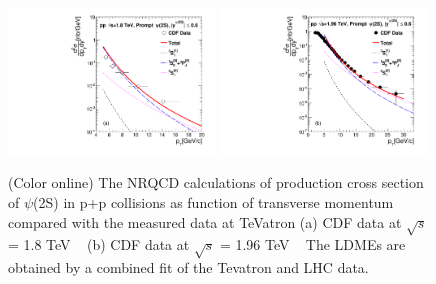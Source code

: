 \documentclass[aps,prc,preprint,superscriptaddress,showpacs,showkeys,amsmath]{revtex4-1}
\begin{document}
\begin{figure}
\includegraphics[width=0.49\textwidth]{Figures/Psi2S/Psi2S_CDF_180TeV.pdf}
\includegraphics[width=0.49\textwidth]{Figures/Psi2S/Psi2S_CDF_196TeV.pdf}
\caption{(Color online) The NRQCD calculations of production cross section 
of $\psi$(2S) in p+p collisions as function of transverse momentum compared 
with the measured data at TeVatron 
(a) CDF data at $\sqrt{s}$ = 1.8 TeV ~\cite{Abe:1997jz} 
(b) CDF data at $\sqrt{s}$ = 1.96 TeV ~\cite{Acosta:2004yw} 
The LDMEs are obtained by a combined fit of the Tevatron and
LHC data.
}
\label{Fig:LDMEPsi2SCDF}
\end{figure}

\end{document}
